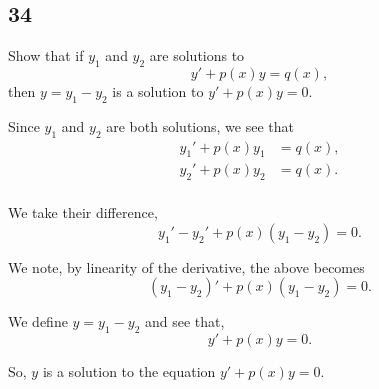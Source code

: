 \documentclass[../hw11]{subfiles}
\begin{document}
\subsection*{34}

Show that if $y_1$ and $y_2$ are solutions to \[y'+p(x)y=q(x),\] then $y=y_1-y_2$ is a solution to $y'+p(x)y=0$.

Since $y_1$ and $y_2$ are both solutions, we see that
\begin{align*}
    {y_1}'+p(x)y_1&=q(x),\\
    {y_2}'+p(x)y_2&=q(x).\\
\end{align*}

We take their difference,
\[{y_1}'-{y_2}'+p(x)(y_1-y_2)=0.\]

We note, by linearity of the derivative, the above becomes
\[{(y_1-y_2)}'+p(x)(y_1-y_2)=0.\]

We define $y=y_1-y_2$ and see that,
\[y'+p(x)y=0.\]

So, $y$ is a solution to the equation $y'+p(x)y=0$.








\end{document}
